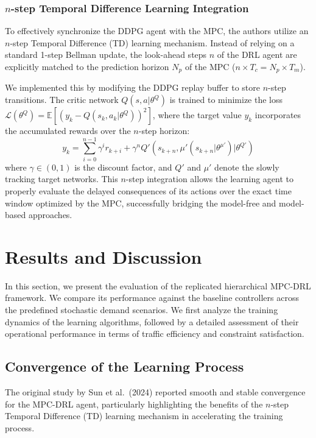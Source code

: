 \subsubsection*{$n$-step Temporal Difference Learning Integration}
To effectively synchronize the DDPG agent with the MPC, the authors utilize an $n$-step Temporal Difference (TD) learning mechanism. Instead of relying on a standard 1-step Bellman update, the look-ahead steps $n$ of the DRL agent are explicitly matched to the prediction horizon $N_p$ of the MPC ($n \times T_c = N_p \times T_m$). 

We implemented this by modifying the DDPG replay buffer to store $n$-step transitions. The critic network $Q(s, a | \theta^Q)$ is trained to minimize the loss $\mathcal{L}(\theta^Q) = \mathbb{E} [(y_k - Q(s_k, a_k | \theta^Q))^2]$, where the target value $y_k$ incorporates the accumulated rewards over the $n$-step horizon:
\begin{equation}
    y_k = \sum_{i=0}^{n-1} \gamma^i r_{k+i} + \gamma^n Q'\left(s_{k+n}, \mu'(s_{k+n} | \theta^{\mu'}) \Big| \theta^{Q'}\right)
\end{equation}
where $\gamma \in (0, 1)$ is the discount factor, and $Q'$ and $\mu'$ denote the slowly tracking target networks. This $n$-step integration allows the learning agent to properly evaluate the delayed consequences of its actions over the exact time window optimized by the MPC, successfully bridging the model-free and model-based approaches.

\section{Results and Discussion}

In this section, we present the evaluation of the replicated hierarchical MPC-DRL framework. We compare its performance against the baseline controllers across the predefined stochastic demand scenarios. We first analyze the training dynamics of the learning algorithms, followed by a detailed assessment of their operational performance in terms of traffic efficiency and constraint satisfaction.

\newpage

\subsection{Convergence of the Learning Process}

The original study by Sun et al.~(2024) \cite{sun2024novel} reported smooth and stable convergence for the MPC-DRL agent, particularly highlighting the benefits of the $n$-step Temporal Difference (TD) learning mechanism in accelerating the training process. 


